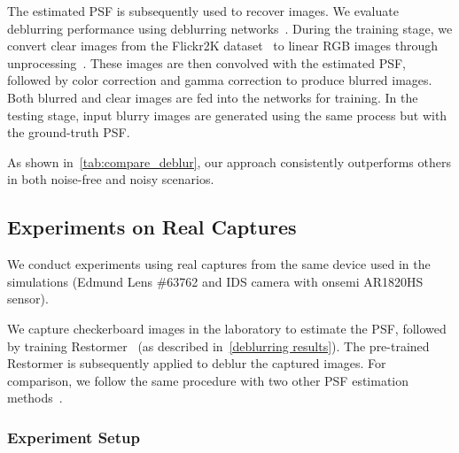 The estimated PSF is subsequently used to recover images. We evaluate deblurring performance using deblurring networks~\cite{zamir2021multi, zamir2022restormer, kong2023efficient}. During the training stage, we convert clear images from the Flickr2K dataset~\cite{lim2017enhanced} to linear RGB images through unprocessing~\cite{brooks2019unprocessing}. These images are then convolved with the estimated PSF, followed by color correction and gamma correction to produce blurred images. Both blurred and clear images are fed into the networks for training. In the testing stage, input blurry images are generated using the same process but with the ground-truth PSF.

As shown in~\cref{tab:compare_deblur}, our approach consistently outperforms others in both noise-free and noisy scenarios.



\subsection{Experiments on Real Captures}

We conduct experiments using real captures from the same device used in the simulations (Edmund Lens \#63762 and IDS camera with onsemi AR1820HS sensor). 


We capture checkerboard images in the laboratory to estimate the PSF, followed by training Restormer~\cite{zamir2022restormer} (as described in~\cref{deblurring results}). The pre-trained Restormer is subsequently applied to deblur the captured images. For comparison, we follow the same procedure with two other PSF estimation methods~\cite{chen2021extreme, eboli2022fast}.





\subsubsection{Experiment Setup}




